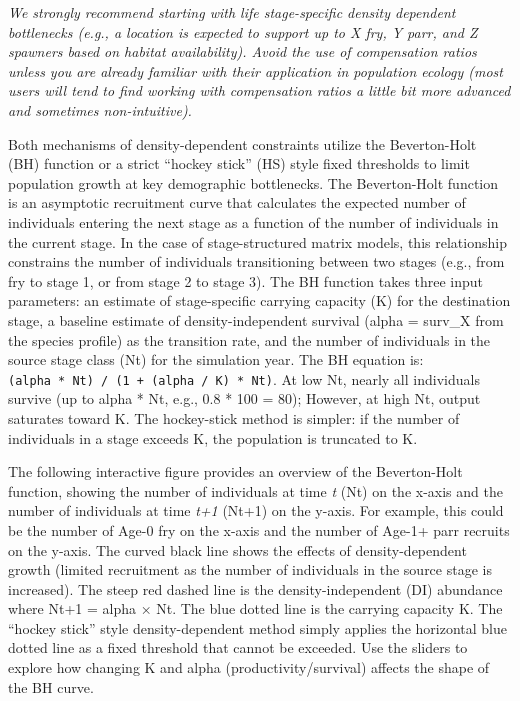 \documentclass[
  letterpaper,
  DIV=11,
  numbers=noendperiod]{scrreprt}
\begin{document}
\emph{We strongly recommend starting with life stage-specific density
dependent bottlenecks (e.g., a location is expected to support up to X
fry, Y parr, and Z spawners based on habitat availability). Avoid the
use of compensation ratios unless you are already familiar with their
application in population ecology (most users will tend to find working
with compensation ratios a little bit more advanced and sometimes
non-intuitive).}

Both mechanisms of density-dependent constraints utilize the
Beverton-Holt (BH) function or a strict ``hockey stick'' (HS) style
fixed thresholds to limit population growth at key demographic
bottlenecks. The Beverton-Holt function is an asymptotic recruitment
curve that calculates the expected number of individuals entering the
next stage as a function of the number of individuals in the current
stage. In the case of stage-structured matrix models, this relationship
constrains the number of individuals transitioning between two stages
(e.g., from fry to stage 1, or from stage 2 to stage 3). The BH function
takes three input parameters: an estimate of stage-specific carrying
capacity (K) for the destination stage, a baseline estimate of
density-independent survival (alpha = surv\_X from the species profile)
as the transition rate, and the number of individuals in the source
stage class (Nt) for the simulation year. The BH equation is:
\texttt{(alpha\ *\ Nt)\ /\ (1\ +\ (alpha\ /\ K)\ *\ Nt)}. At low Nt,
nearly all individuals survive (up to alpha * Nt, e.g., 0.8 * 100 = 80);
However, at high Nt, output saturates toward K. The hockey-stick method
is simpler: if the number of individuals in a stage exceeds K, the
population is truncated to K.

The following interactive figure provides an overview of the
Beverton-Holt function, showing the number of individuals at time
\emph{t} (Nt) on the x-axis and the number of individuals at time
\emph{t+1} (Nt+1) on the y-axis. For example, this could be the number
of Age-0 fry on the x-axis and the number of Age-1+ parr recruits on the
y-axis. The curved black line shows the effects of density-dependent
growth (limited recruitment as the number of individuals in the source
stage is increased). The steep red dashed line is the
density-independent (DI) abundance where Nt+1 = alpha × Nt. The blue
dotted line is the carrying capacity K. The ``hockey stick'' style
density-dependent method simply applies the horizontal blue dotted line
as a fixed threshold that cannot be exceeded. Use the sliders to explore
how changing K and alpha (productivity/survival) affects the shape of
the BH curve.
\end{document}
